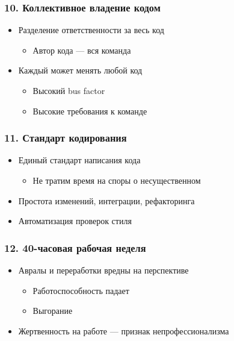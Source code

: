 \documentclass{../../slides-style}
\begin{document}
    \begin{frame}
        \frametitle{10. Коллективное владение кодом}
        \begin{itemize}
            \item Разделение ответственности за весь код
            \begin{itemize}
                \item Автор кода --- вся команда
            \end{itemize}
            \item Каждый может менять любой код
            \begin{itemize}
                \item Высокий bus factor 
                \item Высокие требования к команде
            \end{itemize}
        \end{itemize}
    \end{frame}

    \begin{frame}
        \frametitle{11. Стандарт кодирования}
        \begin{itemize}
            \item Единый стандарт написания кода
            \begin{itemize}
                \item Не тратим время на споры о несущественном
            \end{itemize}
            \item Простота изменений, интеграции, рефакторинга
            \item Автоматизация проверок стиля
        \end{itemize}
    \end{frame}

    \begin{frame}
        \frametitle{12. 40-часовая рабочая неделя}
        \begin{itemize}
            \item Авралы и переработки вредны на перспективе
            \begin{itemize}
                \item Работоспособность падает
                \item Выгорание
            \end{itemize}
            \item Жертвенность на работе --- признак непрофессионализма
        \end{itemize}
    \end{frame}
\end{document}
